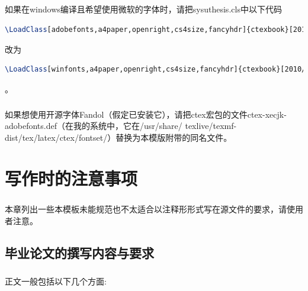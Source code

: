 ﻿\documentclass{sysuthesis}
\begin{document}
\paragraph{}如果在windows编译且希望使用微软的字体时，请把{\ttfamily sysuthesis.cls}中以下代码
\begin{lstlisting}[language=TeX, keywordstyle=\color{blue}\bfseries, basicstyle=\ttfamily, breaklines=true, frame=shadowbox]
\LoadClass[adobefonts,a4paper,openright,cs4size,fancyhdr]{ctexbook}[2010/01/22]
\end{lstlisting}
改为
\begin{lstlisting}[language=TeX, keywordstyle=\color{blue}\bfseries, basicstyle=\ttfamily, breaklines=true, frame=shadowbox]
\LoadClass[winfonts,a4paper,openright,cs4size,fancyhdr]{ctexbook}[2010/01/22]
\end{lstlisting}。

\paragraph{}如果想使用开源字体{\ttfamily Fandol}（假定已安装它），请把{\ttfamily ctex}宏包的文件{\ttfamily ctex-xecjk-adobefonts.def}（在我的系统中，它在{\ttfamily /usr/share/ texlive/texmf-dist/tex/latex/ctex/fontset/}）替换为本模版附带的同名文件。

\chapter{写作时的注意事项}

\paragraph{}本章列出一些本模板未能规范也不太适合以注释形形式写在源文件的要求，请使用者注意。

\section{毕业论文的撰写内容与要求}

\paragraph{}正文一般包括以下几个方面:
\end{document}

